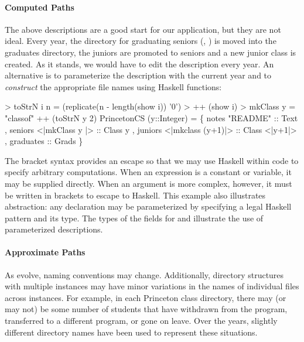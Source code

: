 \paragraph*{Computed Paths}
\label{sec:computed-paths}

The above descriptions are a good start for our application, but they are
not ideal.  Every year, the directory for graduating seniors 
(\ie{}, ) is moved into the graduates directory,
the juniors are promoted to seniors and a new junior class is created.
As it stands, we would have to edit the description every year.
An alternative is to parameterize the description with the current year and
to \textit{construct} the appropriate file names using Haskell functions:
\begin{code}
> toStrN i n = (replicate(n - length(show i)) '0') 
>              ++ (show i)
> mkClass y = "classof" ++ (toStrN y 2)
\mbox{}
 PrincetonCS (y::Integer) = 
  \{ notes    "README" :: Text
  , seniors  <|mkClass y    |> :: Class y
  , juniors  <|mkclass (y+1)|> :: Class <|y+1|>
  , graduates :: Grads \}
\end{code}
The bracket syntax  provides an escape so that we may use
Haskell within \forest{} code to specify arbitrary computations.  
When an expression is a constant or variable,
it may be supplied directly.  When an argument is more complex,
however, it must be written in brackets to escape to Haskell.
This example also
illustrates abstraction: any \forest{} declaration may be
parameterized by specifying a legal Haskell pattern and
its type.  The types of the fields for  and 
illustrate the use of parameterized descriptions.

\paragraph*{Approximate Paths}
As \filestores{} evolve, naming conventions may change.
Additionally, directory structures with multiple instances may have
minor variations in the names of individual files across instances.  
For example, in each Princeton class directory, there may
(or may not) be some number of students that have withdrawn from the
program, transferred to a different program, or gone on
leave.  Over the years, slightly different directory names
have been used to represent these situations.  

